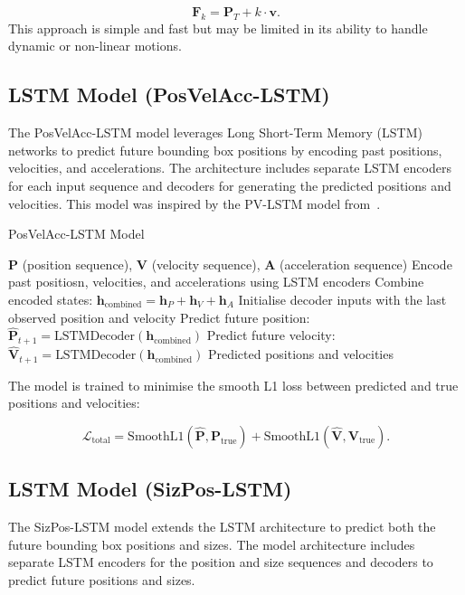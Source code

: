 \documentclass[12pt,oneside]{book} %
\begin{document}
\begin{equation}
    \mathbf{F}_k = \mathbf{P}_T + k \cdot \mathbf{v}.
\end{equation}
This approach is simple and fast but may be limited in its ability to handle
dynamic or non-linear motions.

\subsection*{LSTM Model (PosVelAcc-LSTM)}
\noindent The PosVelAcc-LSTM model leverages Long Short-Term Memory (LSTM) networks to
predict future bounding box positions by encoding past positions, velocities,
and accelerations. The architecture includes separate LSTM encoders for each
input sequence and decoders for generating the predicted positions and
velocities. This model was inspired by the PV-LSTM model
from~\citet{DBLP:journals/corr/abs-2010-10270}.

\begin{algorithm}
    \caption{PosVelAcc-LSTM Model}\label{alg:lstm_posvelacc}
    \begin{algorithmic}[1]
        \Require $\mathbf{P}$ (position sequence), $\mathbf{V}$ (velocity sequence), $\mathbf{A}$ (acceleration sequence)
        \State Encode past positiosn, velocities, and accelerations using LSTM encoders
        \State Combine encoded states: $\mathbf{h}_{\text{combined}} = \mathbf{h}_P + \mathbf{h}_V + \mathbf{h}_A$
        \State Initialise decoder inputs with the last observed position and velocity
         
        \State Predict future position: $\hat{\mathbf{P}}_{t+1} = \text{LSTMDecoder}(\mathbf{h}_{\text{combined}})$
        \State Predict future velocity: $\hat{\mathbf{V}}_{t+1} = \text{LSTMDecoder}(\mathbf{h}_{\text{combined}})$
        \EndFor
        \State \Return Predicted positions and velocities
    \end{algorithmic}
\end{algorithm}

\noindent The model is trained to minimise the smooth L1 loss between predicted and true
positions and velocities:

\begin{equation}
    \mathcal{L}_{\text{total}} = \text{SmoothL1}(\hat{\mathbf{P}}, \mathbf{P}_{\text{true}}) + \text{SmoothL1}(\hat{\mathbf{V}}, \mathbf{V}_{\text{true}}).
\end{equation}

\subsection*{LSTM Model (SizPos-LSTM)}
\noindent The SizPos-LSTM model extends the LSTM architecture to predict both the future
bounding box positions and sizes. The model architecture includes separate LSTM
encoders for the position and size sequences and decoders to predict future
positions and sizes.
\end{document}
